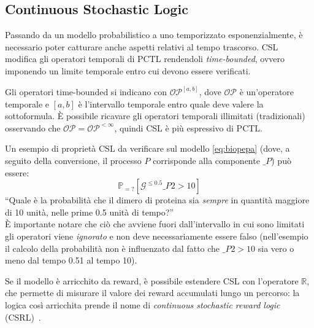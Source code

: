 		\subsection{Continuous Stochastic Logic}
		Passando da un modello probabilistico a uno temporizzato esponenzialmente, \`e necessario poter catturare anche aspetti relativi al tempo trascorso.
		CSL~\cite{baier2003model} modifica gli operatori temporali di PCTL rendendoli \emph{time-bounded}, ovvero imponendo un limite temporale entro cui devono essere verificati.
		
		Gli operatori time-bounded si indicano con $\mathcal{OP}^{[a,b]}$, dove $\mathcal{OP}$ \`e un'operatore temporale e $[a,b]$ \`e l'intervallo temporale entro quale deve valere la sottoformula.
		\`E possibile ricavare gli operatori temporali illimitati (tradizionali) osservando che $\mathcal{OP} = \mathcal{OP}^{< \infty}$, quindi CSL \`e pi\`u espressivo di PCTL.
		
		Un esempio di propriet\`a CSL da verificare sul modello \ref{eq:biopepa} (dove, a seguito della conversione, il processo $P$ corrisponde alla componente $\_P$) pu\`o essere:
		\begin{equation*}
			\mathbb{P}_{=?}[\mathcal{G}^{\leq 0.5} \_P2 > 10]
		\end{equation*}
		``Quale \`e la probabilit\`a che il dimero di proteina sia \emph{sempre} in quantit\`a maggiore di 10 unit\`a, nelle prime 0.5 unit\`a di tempo?''\\
		\`E importante notare che ci\`o che avviene fuori dall'intervallo in cui sono limitati gli operatori viene \emph{ignorato} e non deve necessariamente essere falso (nell'esempio il calcolo della probabilit\`a non \`e influenzato dal fatto che $\_P2 > 10$ sia vero o meno dal tempo 0.51 al tempo 10).
		
		Se il modello \`e arricchito da reward, \`e possibile estendere CSL con l'operatore $\mathbb{R}$, che permette di misurare il valore dei reward accumulati lungo un percorso: la logica cos\`i arricchita prende il nome di \emph{continuous stochastic reward logic} (CSRL)~\cite{baier2000logical}.		
		
